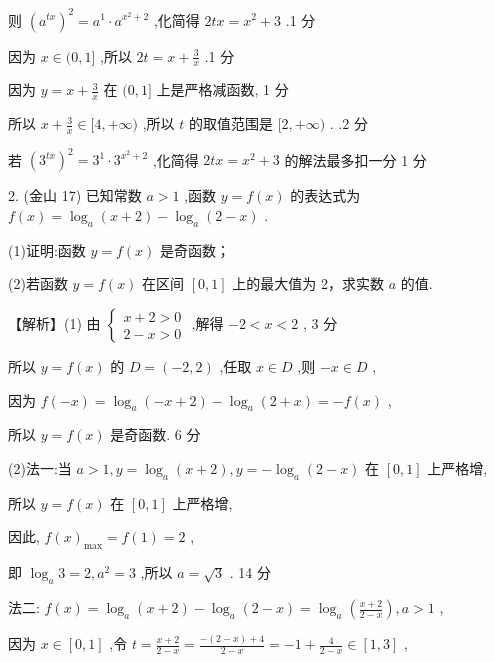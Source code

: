 \documentclass[10pt]{article}
\begin{document}
则 \({\left( {a}^{tx}\right) }^{2} = {a}^{1} \cdot  {a}^{{x}^{2} + 2}\) ,化简得 \({2tx} = {x}^{2} + 3\) .1 分

因为 \(x \in  (0,1\rbrack\) ,所以 \({2t} = x + \frac{3}{x}\) .1 分

因为 \(y = x + \frac{3}{x}\) 在 \((0,1\rbrack\) 上是严格减函数, 1 分

所以 \(x + \frac{3}{x} \in  \lbrack 4, + \infty )\) ,所以 \(t\) 的取值范围是 \(\lbrack 2, + \infty )\) . .2 分

若 \({\left( {3}^{tx}\right) }^{2} = {3}^{1} \cdot  {3}^{{x}^{2} + 2}\) ,化简得 \({2tx} = {x}^{2} + 3\) 的解法最多扣一分 1 分

2. (金山 17) 已知常数 \(a > 1\) ,函数 \(y = f\left( x\right)\) 的表达式为 \(f\left( x\right)  = {\log }_{a}\left( {x + 2}\right)  - {\log }_{a}\left( {2 - x}\right)\) .

(1)证明:函数 \(y = f\left( x\right)\) 是奇函数；

(2)若函数 \(y = f\left( x\right)\) 在区间 \(\left\lbrack  {0,1}\right\rbrack\) 上的最大值为 2，求实数 \(a\) 的值.

【解析】(1) 由 \(\left\{  \begin{array}{l} x + 2 > 0 \\  2 - x > 0 \end{array}\right.\) ,解得 \(- 2 < x < 2\) , 3 分

所以 \(y = f\left( x\right)\) 的 \(D = \left( {-2,2}\right)\) ,任取 \(x \in  D\) ,则 \(- x \in  D\) ,

因为 \(f\left( {-x}\right)  = {\log }_{a}\left( {-x + 2}\right)  - {\log }_{a}\left( {2 + x}\right)  =  - f\left( x\right)\) ,

所以 \(y = f\left( x\right)\) 是奇函数. 6 分

(2)法一:当 \(a > 1,y = {\log }_{a}\left( {x + 2}\right) ,y =  - {\log }_{a}\left( {2 - x}\right)\) 在 \(\left\lbrack  {0,1}\right\rbrack\) 上严格增,

所以 \(y = f\left( x\right)\) 在 \(\left\lbrack  {0,1}\right\rbrack\) 上严格增,

因此, \(f{\left( x\right) }_{\max } = f\left( 1\right)  = 2\) ,

即 \({\log }_{a}3 = 2,{a}^{2} = 3\) ,所以 \(a = \sqrt{3}\) . 14 分

法二: \(f\left( x\right)  = {\log }_{a}\left( {x + 2}\right)  - {\log }_{a}\left( {2 - x}\right)  = {\log }_{a}\left( \frac{x + 2}{2 - x}\right) ,a > 1\) ,

因为 \(x \in  \left\lbrack  {0,1}\right\rbrack\) ,令 \(t = \frac{x + 2}{2 - x} = \frac{-\left( {2 - x}\right)  + 4}{2 - x} =  - 1 + \frac{4}{2 - x} \in  \left\lbrack  {1,3}\right\rbrack\) ,
\end{document}
